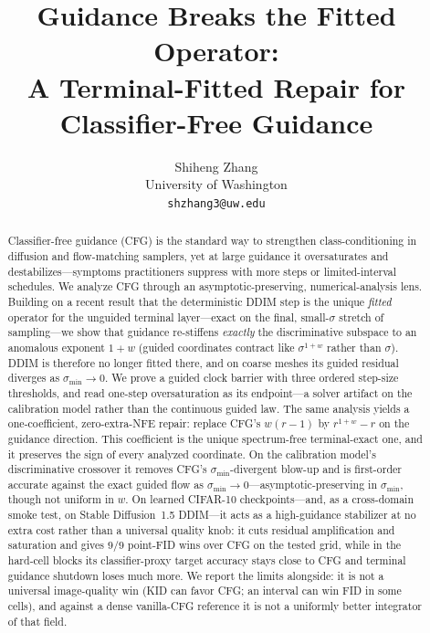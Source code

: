 \documentclass{article} %
\title{Guidance Breaks the Fitted Operator:\\
A Terminal-Fitted Repair for Classifier-Free Guidance}
\author{Shiheng Zhang \\
University of Washington \\
\texttt{shzhang3@uw.edu}}
\theoremstyle{plain}
\theoremstyle{definition}
\theoremstyle{remark}
\providecommand{\smin}{\sigma_{\min}}
\begin{document}
\pagestyle{plain}

\maketitle

\begin{abstract}
Classifier-free guidance (CFG) is the standard way to strengthen
class-conditioning in diffusion and flow-matching samplers, yet at large
guidance it oversaturates and destabilizes---symptoms practitioners suppress
with more steps or limited-interval schedules. We analyze CFG through an
asymptotic-preserving, numerical-analysis lens. Building on a
recent result \citep{ap2026} that the deterministic DDIM step is the unique
\emph{fitted} operator for the unguided terminal layer---exact on the final,
small-$\sigma$ stretch of sampling---we show
that guidance re-stiffens \emph{exactly} the discriminative subspace to an
anomalous exponent $1+w$ (guided coordinates contract like $\sigma^{1+w}$
rather than $\sigma$). DDIM is therefore no longer fitted there, and on coarse
meshes its guided residual diverges as $\smin\to0$. We prove a guided clock barrier with three ordered step-size
thresholds, and read one-step oversaturation as its endpoint---a solver artifact
on the calibration model rather than the continuous guided law. The same analysis
yields a one-coefficient, zero-extra-NFE repair: replace CFG's $w(r-1)$ by
$r^{1+w}-r$ on the guidance direction. This coefficient is the unique
spectrum-free terminal-exact one, and it preserves the sign of every analyzed
coordinate. On the calibration model's discriminative
crossover it removes CFG's $\smin$-divergent blow-up and is first-order accurate
against the exact guided flow as $\smin\to0$---asymptotic-preserving in $\smin$,
though not uniform in $w$. On learned CIFAR-10 checkpoints---and, as a cross-domain smoke test, on
Stable Diffusion~1.5 DDIM---it acts as a high-guidance stabilizer at no extra
cost rather than a universal quality knob: it cuts residual amplification and
saturation and gives $9/9$ point-FID wins over CFG on the tested grid, while in
the hard-cell blocks its classifier-proxy target accuracy stays close to CFG and
terminal guidance shutdown loses much more. We report the limits alongside: it
is not a universal image-quality win (KID can favor CFG; an interval can win FID
in some cells), and against a dense vanilla-CFG reference it is not a uniformly
better integrator of that field.
\end{abstract}
\end{document}
